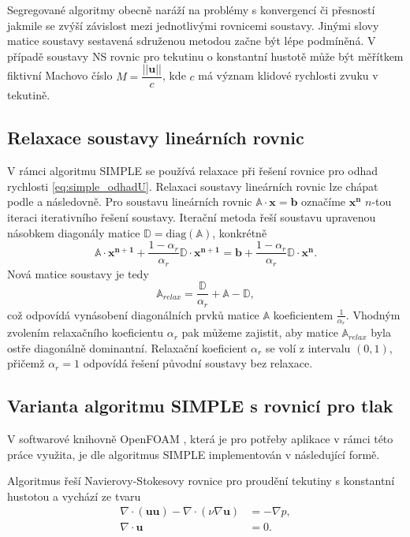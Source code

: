 Segregované algoritmy obecně naráží na problémy s konvergencí či přesností jakmile se zvýší závislost mezi jednotlivými rovnicemi soustavy. Jinými slovy matice soustavy sestavená sdruženou metodou začne být lépe podmíněná. V případě soustavy NS rovnic pro tekutinu o konstantní hustotě může být měřítkem fiktivní Machovo číslo $ M = \dfrac{||\mathbf{u}||}{c} $, kde $ c $ má význam klidové rychlosti zvuku v tekutině. 

\subsection{Relaxace soustavy lineárních rovnic}
V rámci algoritmu SIMPLE se používá relaxace\cite{furst2020mko2} při řešení rovnice pro odhad rychlosti \ref{eq:simple_odhadU}. Relaxaci soustavy lineárních rovnic lze chápat podle \cite{saad2003iterative} a \cite{furst2020mko2} následovně.
Pro soustavu lineárních rovnic $\mathbb{A}\cdot\mathbf{x}=\mathbf{b} $ označíme $ \mathbf{x^n} $ $ n $-tou iteraci iterativního řešení soustavy. Iterační metoda řeší soustavu upravenou násobkem diagonály matice $ \mathbb{D}=\mathrm{diag}(\mathbb{A}) $, konkrétně
\begin{equation}
\mathbb{A}\cdot\mathbf{x^{n+1}}
+\dfrac{1-\alpha_r}{\alpha_r}\mathbb{D}\cdot\mathbf{x^{n+1}}
=
\mathbf{b}+\dfrac{1-\alpha_r}{\alpha_r}\mathbb{D}\cdot\mathbf{x^n}.
\end{equation}
Nová matice soustavy je tedy
\begin{equation}\label{key}
\mathbb{A}_{relax}=\dfrac{\mathbb{D}}{\alpha_r}+\mathbb{A}-\mathbb{D},
\end{equation}
což odpovídá vynásobení diagonálních prvků matice $ \mathbb{A} $ koeficientem $ \frac{1}{\alpha_r} $. Vhodným zvolením relaxačního koeficientu $ \alpha_r $ pak můžeme zajistit, aby matice $ \mathbb{A}_{relax} $ byla ostře diagonálně dominantní. Relaxační koeficient $ \alpha_r $ se volí z intervalu $ (0,1) $, přičemž $ \alpha_r=1 $ odpovídá řešení původní soustavy bez relaxace.

\subsection{Varianta algoritmu SIMPLE s rovnicí pro tlak}
V softwarové knihovně OpenFOAM \cite{weller1998tensorial}, která je pro potřeby aplikace v rámci této práce využita, je dle \cite{furst2020mko2} algoritmus SIMPLE implementován v následující formě. 

Algoritmus řeší Navierovy-Stokesovy rovnice pro proudění tekutiny s konstantní hustotou a vychází ze tvaru
\begin{align}
\nabla \cdot (\mathbf{u} \mathbf{u} ) - \nabla \cdot (\nu \nabla \mathbf{u}) &= - \nabla p, \label{eq:simple_hyb}\\
\nabla \cdot \mathbf{u} &=0. \label{eq:simple_kont}
\end{align}

